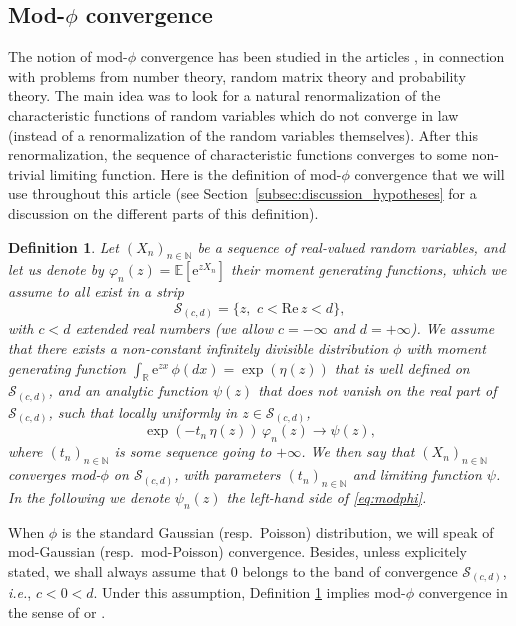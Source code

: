\documentclass[12pt,a4paper,reqno]{amsart}
\newtheorem{definition}[lemma]{Definition}
\theoremstyle{remark}
\newcommand{\N}{\mathbb{N}}
\newcommand{\R}{\mathbb{R}}
\newcommand{\E}{\mathrm{e}}
\newcommand{\esper}{\mathbb{E}}
\renewcommand{\Re}{\mathrm{Re}}
\begin{document}
\subsection{Mod-\texorpdfstring{$\phi$}{phi} convergence}
The notion of mod-$\phi$ convergence has been studied in the articles \cite{JKN11,DKN11,KN10,KN12,BKN09}, in connection with problems from number theory, random matrix theory and  probability theory. The main idea was to look for a natural renormalization of the characteristic functions of random variables which do not converge in law (instead of a renormalization of the random variables themselves). After this renormalization, the sequence of characteristic functions converges to some non-trivial limiting function. Here is the definition of mod-$\phi$ convergence that we will use throughout this article
(see Section~\ref{subsec:discussion_hypotheses} for a discussion on the different parts of this definition).

\begin{definition}\label{def:modphi}
    Let $(X_{n})_{n \in \N}$ be a sequence of real-valued random variables,
    and let us denote by \hbox{$\varphi_{n}(z)=\esper[\E^{zX_{n}}]$} their moment generating functions, which we assume to all exist in a strip 
    $$\mathcal{S}_{(c,d)}=\{z,\,\,c < \Re\, z <d\},$$
     with $c<d$ extended real numbers (we allow $c=-\infty$ and $d=+\infty$). We assume that there exists a non-constant infinitely divisible distribution $\phi$ with moment generating function $\int_{\R} \E^{zx}\, \phi(dx)=\exp(\eta(z))$ that is well defined on $\mathcal{S}_{(c,d)}$, and an analytic function $\psi(z)$ that does not vanish on the real part of $\mathcal{S}_{(c,d)}$, such that locally uniformly in $z \in \mathcal{S}_{(c,d)}$, 
\begin{equation}
\exp(-t_{n}\,\eta(z))\,\varphi_{n}(z) \to \psi(z),\label{eq:modphi}
\end{equation}
where $(t_{n})_{n \in \N}$  is some sequence going to $+\infty$. We then say that $(X_{n})_{n \in \N}$ \emph{converges mod-$\phi$} on $\mathcal{S}_{(c,d)}$, with parameters $(t_{n})_{n \in \N}$ and limiting function $\psi$. In the following we denote $\psi_{n}(z)$ the left-hand side of \eqref{eq:modphi}.
\end{definition}\medskip

\noindent When $\phi$ is the standard Gaussian (resp.~Poisson) distribution, we will speak of mod-Gaussian (resp.~mod-Poisson) convergence. 
Besides, unless explicitely stat\-ed, we shall always assume that $0$ belongs to the band of convergence $\mathcal{S}_{(c,d)}$, \emph{i.e.}, $c<0<d$. Under this assumption, Definition \ref{def:modphi} implies mod-$\phi$ convergence in the sense of \cite[Definition 1.1]{JKN11} or \cite[Section 2]{DKN11}.\bigskip    
\end{document}
